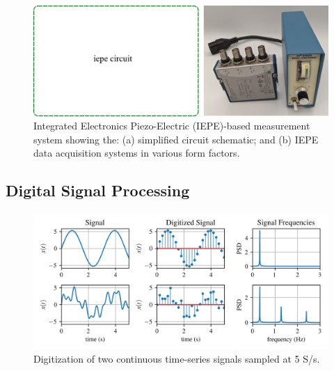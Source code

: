 \documentclass[12pt,letter]{article}
\numberwithin{ex}{section} %
\numberwithin{re}{section} %
\begin{document}


\begin{figure}[H]
    \centering
    \includegraphics[width=6.5in]{../Figures/IEPE.png}
    \caption{Integrated Electronics Piezo-Electric (IEPE)-based measurement system showing the: (a) simplified circuit schematic\protect\footnotemark[1]; and (b) IEPE data acquisition systems in various form factors.}
    \label{fig:IEPE}
\end{figure} 







\subsection{Digital Signal Processing}





\begin{figure}[H]
    \centering
    \includegraphics[width=6.5in]{../Figures/signal_digitization.png}
    \caption{Digitization of two continuous time-series signals sampled at 5 S/s.}
    \label{fig:signal_digitization}
\end{figure}
\end{document}
